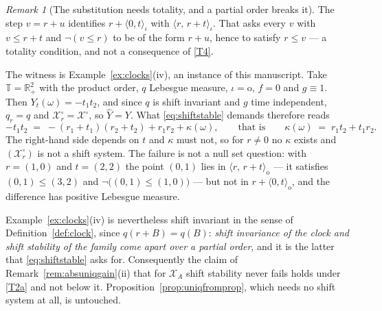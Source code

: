 \documentclass[11pt,a4paper]{article}
\theoremstyle{plain}
\theoremstyle{definition}
\theoremstyle{remark}
\newtheorem{remark}[theorem]{Remark}
\newcommand{\R}{\mathbb{R}}
\newcommand{\Rp}{\R_+}
\newcommand{\T}{\mathbb{T}}                     %
\newcommand{\XX}{\mathcal{X}}                  %
\begin{document}
\begin{remark}[The substitution needs totality, and a partial order breaks it]
  \label{rem:shiftXAtotal}
  The step $v = r+u$ identifies $r + \langle 0,t \rangle_\iota$ with
  $\langle r,\,r+t \rangle_\iota$.  That asks every $v$ with $v \leq r+t$ and
  $\neg (v \leq r)$ to be of the form $r+u$, hence to satisfy $r \leq v$ --- a
  totality condition, and not a consequence of \eqref{T4}.

  The witness is Example~\ref{ex:clocks}(iv), an instance of this manuscript.
  Take $\T = \Rp^2$ with the product order, $q$ Lebesgue measure,
  $\iota = \mathrm{o}$, $f = 0$ and $g \equiv 1$.  Then $Y_t(\omega) = -t_1t_2$,
  and since $q$ is shift invariant and $g$ time independent, $q_r = q$ and
  $\XX^\circ_r = \XX^\circ$, so $\hat Y = Y$.  What \eqref{eq:shiftstable}
  demands therefore reads
  \[
    -t_1t_2 \;=\; -(r_1+t_1)(r_2+t_2) + r_1r_2 + \kappa(\omega),
    \qquad\text{that is}\qquad
    \kappa(\omega) \;=\; r_1t_2 + t_1r_2 .
  \]
  The right-hand side depends on $t$ and $\kappa$ must not, so for $r \neq 0$ no
  $\kappa$ exists and $(\XX^\circ_r)$ is not a shift system.  The failure is not
  a null set question: with $r = (1,0)$ and $t = (2,2)$ the point $(0,1)$ lies in
  $\langle r,\,r+t \rangle_\mathrm{o}$ --- it satisfies $(0,1) \leq (3,2)$ and
  $\neg\bigl((0,1) \leq (1,0)\bigr)$ --- but not in
  $r + \langle 0,t \rangle_\mathrm{o}$, and the difference has positive Lebesgue
  measure.

  Example~\ref{ex:clocks}(iv) is nevertheless shift invariant in the sense of
  Definition~\ref{def:clock}, since $q(r+B) = q(B)$: \emph{shift invariance of
  the clock and shift stability of the family come apart over a partial order},
  and it is the latter that \eqref{eq:shiftstable} asks for.  Consequently the
  claim of Remark~\ref{rem:absuniqgain}(ii) that for $\XX_A$ shift stability
  never fails holds under \eqref{T2a} and not below it.  Proposition~\ref{prop:uniqfromprop},
  which needs no shift system at all, is untouched.
\end{remark}
\end{document}

